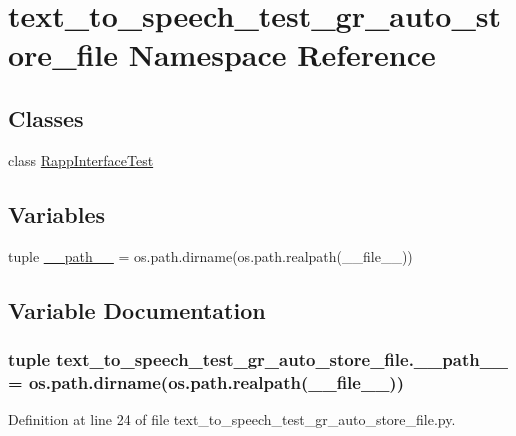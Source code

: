 \hypertarget{namespacetext__to__speech__test__gr__auto__store__file}{\section{text\-\_\-to\-\_\-speech\-\_\-test\-\_\-gr\-\_\-auto\-\_\-store\-\_\-file Namespace Reference}
\label{namespacetext__to__speech__test__gr__auto__store__file}
}
\subsection*{Classes}
\begin{DoxyCompactItemize}
\item 
class \hyperlink{classtext__to__speech__test__gr__auto__store__file_1_1RappInterfaceTest}{Rapp\-Interface\-Test}
\end{DoxyCompactItemize}
\subsection*{Variables}
\begin{DoxyCompactItemize}
\item 
tuple \hyperlink{namespacetext__to__speech__test__gr__auto__store__file_a8763434c28f1c1adba4c74c1c18f8f5a}{\-\_\-\-\_\-path\-\_\-\-\_\-} = os.\-path.\-dirname(os.\-path.\-realpath(\-\_\-\-\_\-file\-\_\-\-\_\-))
\end{DoxyCompactItemize}


\subsection{Variable Documentation}
\hypertarget{namespacetext__to__speech__test__gr__auto__store__file_a8763434c28f1c1adba4c74c1c18f8f5a}{
\subsubsection[{\-\_\-\-\_\-path\-\_\-\-\_\-}]{\setlength{\rightskip}{0pt plus 5cm}tuple text\-\_\-to\-\_\-speech\-\_\-test\-\_\-gr\-\_\-auto\-\_\-store\-\_\-file.\-\_\-\-\_\-path\-\_\-\-\_\- = os.\-path.\-dirname(os.\-path.\-realpath(\-\_\-\-\_\-file\-\_\-\-\_\-))}}\label{namespacetext__to__speech__test__gr__auto__store__file_a8763434c28f1c1adba4c74c1c18f8f5a}


Definition at line 24 of file text\-\_\-to\-\_\-speech\-\_\-test\-\_\-gr\-\_\-auto\-\_\-store\-\_\-file.\-py.

